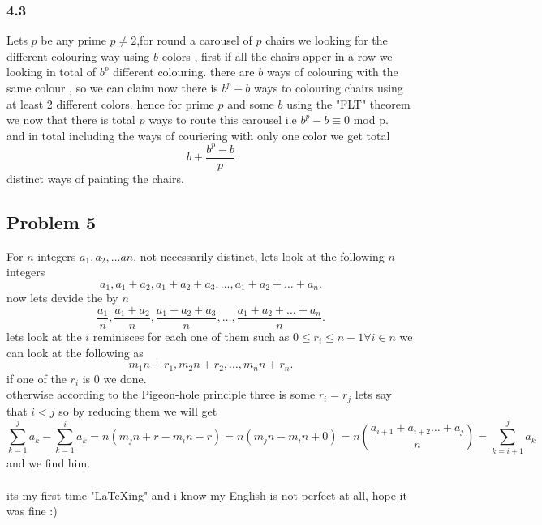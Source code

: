 \documentclass[12pt]{article}
\begin{document}
\subsubsection*{4.3}
Lets $p$ be any prime $p\neq 2$,for round  a carousel of $p$ chairs we looking for the different colouring way using $b$ colors , first if all the chairs apper in a row we looking in total of $b^p$ different colouring. there are  $b$ ways of colouring with the same colour , so we can claim now there is $b^p - b$ ways to colouring chairs using at least 2 different colors. 
hence for prime $p$ and some $b$ using the "FLT" theorem we now that there is total $p$ ways to route this carousel i.e $b^p-b \equiv 0$ mod p.
\\and in total including the ways of couriering with only one color we get total
 \[ b+ \dfrac{b^p-b}{p}
\]
distinct ways of painting the chairs.
\subsection*{Problem 5}
 For $n$ integers $a_1, a_2, \dots an$, not necessarily distinct, lets look at the following $n$ integers
  \[
 a_1, a_1 + a_2, a_1 + a_2 + a_3, \dots , a_1 + a_2 + \dots + a_n.
\] 
now lets devide the by $n$
 \[
\dfrac{a_1}{n} , \dfrac{a_1 + a_2}{n},  \dfrac{a_1 + a_2+a_3}{n}, \dots , \dfrac{a_1 + a_2 + \dots + a_n}{n}.
\] 
 lets look at the $i$ reminisces for each one of them such as $0 \leq r_i \leq n-1 \forall i \in n$
we can look at the following as
\[
 m_1n+r_1, m_2n+r_2,  \dots , m_nn+r_n.
\] 
if one of the $r_i$ is 0 we done.\\ otherwise according to the Pigeon-hole principle three is some $r_i=r_j$ lets say that $i<j$ so by reducing them we will get 
\[
\sum^{j}_{k=1} a_k - \sum^{i}_{k=1} a_k=n(m_jn+r-m_in-r)=n(m_jn-m_in+0)=n(\dfrac{a_{i+1}+a_{i+2} \dots +a_j}{n})=\sum^{j}_{k=i+1} a_k
\] 
and we find him.
\\\\its my first time "LaTeXing" and i know my English is not perfect at all, hope it was fine :)
\end{document}
